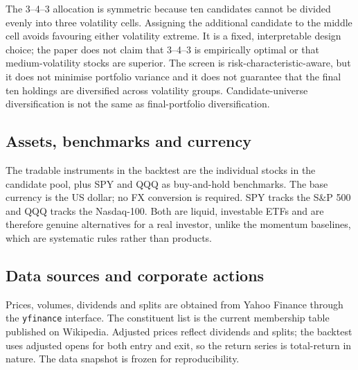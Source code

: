 \documentclass[11pt,a4paper]{article}
\begin{document}
The 3--4--3 allocation is symmetric because ten candidates cannot be divided evenly into three volatility cells. Assigning the additional candidate to the middle cell avoids favouring either volatility extreme. It is a fixed, interpretable design choice; the paper does not claim that 3--4--3 is empirically optimal or that medium-volatility stocks are superior. The screen is risk-characteristic-aware, but it does not minimise portfolio variance and it does not guarantee that the final ten holdings are diversified across volatility groups. Candidate-universe diversification is not the same as final-portfolio diversification.

\subsection{Assets, benchmarks and currency}

The tradable instruments in the backtest are the individual stocks in the candidate pool, plus SPY and QQQ as buy-and-hold benchmarks. The base currency is the US dollar; no FX conversion is required. SPY tracks the S\&P 500 and QQQ tracks the Nasdaq-100. Both are liquid, investable ETFs and are therefore genuine alternatives for a real investor, unlike the momentum baselines, which are systematic rules rather than products.

\subsection{Data sources and corporate actions}

Prices, volumes, dividends and splits are obtained from Yahoo Finance through the \texttt{yfinance} interface. The constituent list is the current membership table published on Wikipedia. Adjusted prices reflect dividends and splits; the backtest uses adjusted opens for both entry and exit, so the return series is total-return in nature. The data snapshot is frozen for reproducibility.
\end{document}
